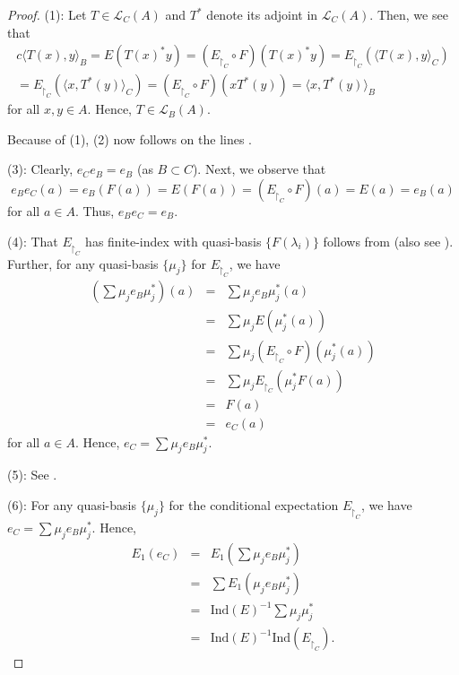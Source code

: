 \documentclass[a4]{amsart}
\numberwithin{equation}{section}
\newcommand{\la}{\langle}
\newcommand{\ra}{\rangle}
\newcommand{\mcal}{\mathcal}
\begin{document}
\begin{proof}
  (1): Let $T \in \mathcal{L}_C(A)$ and $T^*$ denote its adjoint in
  $\mathcal{L}_C(A)$. Then, we see that
  \begin{align*}{c}
  \la T(x), y\ra_B = E(T(x)^*y)= (E_{\restriction_C}\circ F)(T(x)^* y) = E_{\restriction_C} (\la T(x), y \ra_C) 
  \\
  = E_{\restriction_C} (\la x, T^*(y) \ra_C) =  (E_{\restriction_C}\circ F)(x T^* (y)) = \la x, T^*(y) \ra_B
  \end{align*}
 for all $x, y \in A$. Hence, $T \in \mcal{L}_B(A)$.
 \smallskip

  Because of (1), (2) now follows on the lines \cite[Lemma
    4.2]{BG2}. \smallskip


 (3): Clearly, $e_C e_B = e_B$ (as $B\subset
C$). Next, we observe that
  \[
  e_Be_C(a)= e_B(F(a)) = E(F(a)) = (E_{\restriction_C} \circ F)(a) =
  E(a) =e_B(a)
  \]
  for all $a \in A$.     Thus, $e_B e_C = e_B$.
                \smallskip
                
 (4): That $E_{\restriction_C}$ has finite-index with
  quasi-basis $\{F(\lambda_i)\}$ follows from \cite[Page 3]{IW} (also
  see \cite[Proposition 1.7.2]{Wat}). Further, for any quasi-basis
  $\{\mu_j\}$ for $E_{\restriction_C}$, we have
   \begin{eqnarray*}
              	(\sum \mu_{j} e_B \mu_{j}^*)(a) & = & \sum \mu_{j} e_B \mu_{j}^*(a)\\
     & = & \sum \mu_{j} E(\mu_{j}^*(a))\\
    &  = & \sum \mu_{j} (E_{\restriction_C} \circ F)(\mu_{j}^*(a))\\
   &   = & \sum \mu_{j} E_{\restriction_C}(\mu_{j}^* F(a))\\
                &    = & F(a) \\
                & =  &              e_C(a)
\end{eqnarray*}     for all $a\in A$. Hence, $e_C = \sum \mu_j e_B \mu_j^*$.\\
           \smallskip

           (5): See \cite[ Proposition 2.3.2]{Wat}. \smallskip

           (6): For any quasi-basis
    $\{\mu_j \}$ for  the conditional
    expectation $E_{\restriction_C}$, we have $ e_C = \sum \mu_{j} e_B \mu_{j}^* $. Hence,
\begin{eqnarray*}
	E_1(e_C) & = & E_1(\sum \mu_{j} e_B \mu_{j}^*)\\
	& =&  \sum E_1(\mu_{j} e_B \mu_{j}^*) \\
        & = & \mathrm{Ind}(E)^{-1} \sum \mu_j \mu_j^*\\
        & =  & \mathrm{Ind}(E)^{-1} \mathrm{Ind}(E_{\restriction_C}). 
\end{eqnarray*}



\end{proof}
\end{document}
